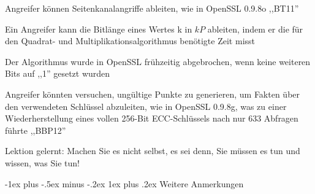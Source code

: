 \documentclass[a4paper]{article}
\makeatletter
\renewcommand{\subsubsection}{\@startsection{subsubsection}{3}{0mm}%
 {-1ex plus -.5ex minus -.2ex}%
 {1ex plus .2ex}%
 {\normalfont\small\bfseries}}
\makeatother
\begin{document}
\begin{multicols}{3}
\begin{itemize*}
\begin{itemize*}
                  \item Angreifer können Seitenkanalangriffe ableiten, wie in OpenSSL 0.9.8o ,,BT11''
                  \begin{itemize*} \item Ein Angreifer kann die Bitlänge eines Wertes k in $kP$ ableiten, indem er die für den Quadrat- und Multiplikationsalgorithmus benötigte Zeit misst \item Der Algorithmus wurde in OpenSSL frühzeitig abgebrochen, wenn keine weiteren Bits auf ,,1'' gesetzt wurden \end{itemize*}
                  \item Angreifer könnten versuchen, ungültige Punkte zu generieren, um Fakten über den verwendeten Schlüssel abzuleiten, wie in OpenSSL 0.9.8g, was zu einer Wiederherstellung eines vollen 256-Bit ECC-Schlüssels nach nur 633 Abfragen führte ,,BBP12''
            \end{itemize*}
            \item Lektion gelernt: Machen Sie es nicht selbst, es sei denn, Sie müssen
            es tun und wissen, was Sie tun!
      \end{itemize*}


      \subsubsection{Weitere Anmerkungen}


\end{multicols}
\end{document}
